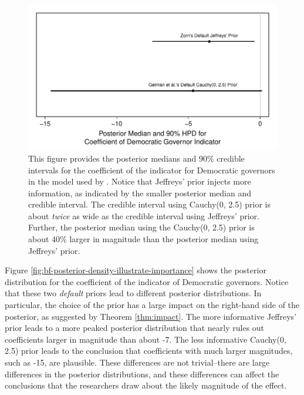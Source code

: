 \documentclass[12pt]{article}
\begin{document}
\begin{figure}[H]
\begin{center}
\includegraphics[scale = .8]{figs/br-coef-illustrate-importance.pdf}
\caption{This figure provides the posterior medians and 90\% credible intervals for the coefficient of the indicator for Democratic governors in the model used by \cite{BarrilleauxRainey2014}. 
Notice that Jeffreys' prior injects more information, as indicated by the smaller posterior median and credible interval. 
The credible interval using Cauchy(0, 2.5) prior is about \emph{twice} as wide as the credible interval using Jeffreys' prior. 
Further, the posterior median using the Cauchy(0, 2.5) prior is about 40\% larger in magnitude than the posterior median using Jeffreys' prior.}\label{fig:br-coef-illustrate-importance}
\end{center}
\end{figure}

Figure \ref{fig:bf-posterior-density-illustrate-importance} shows the posterior distribution for the coefficient of the indicator of Democratic governors. 
Notice that these two \emph{default} priors lead to different posterior distributions. 
In particular, the choice of the prior has a large impact on the right-hand side of the posterior, as suggested by Theorem \ref{thm:impact}. 
The more informative Jeffreys' prior leads to a more peaked posterior distribution that nearly rules out coefficients larger in magnitude than about -7. 
The less informative Cauchy(0, 2.5) prior leads to the conclusion that coefficients with much larger magnitudes, such as -15, are plausible. 
These differences are not trivial--there are large differences in the posterior distributions, and these differences can affect the conclusions that the researchers draw about the likely magnitude of the effect.
\end{document}
